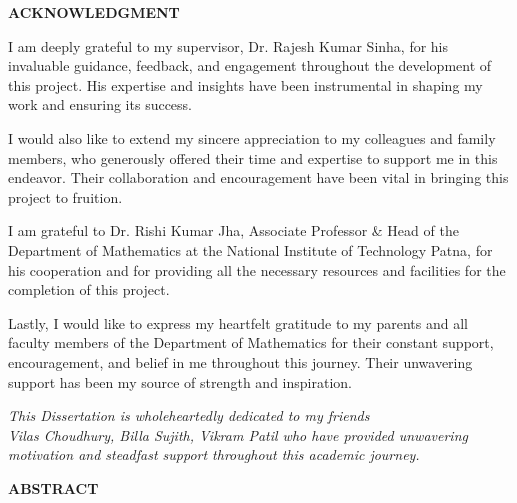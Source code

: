 \documentclass[12pt,a4paper,oneside]{report}
\begin{document}
\newpage
\begin{center}
{\Large\bfseries ACKNOWLEDGMENT}
\end{center}

\vspace{1cm}

\hspace{0.5in}I am deeply grateful to my supervisor, Dr. Rajesh Kumar Sinha, for his invaluable guidance, feedback, and engagement throughout the development of this project. His expertise and insights have been instrumental in shaping my work and ensuring its success.

\hspace{0.5in}I would also like to extend my sincere appreciation to my colleagues and family members, who generously offered their time and expertise to support me in this endeavor. Their collaboration and encouragement have been vital in bringing this project to fruition.

\hspace{0.5in}I am grateful to Dr. Rishi Kumar Jha, Associate Professor \& Head of the Department of Mathematics at the National Institute of Technology Patna, for his cooperation and for providing all the necessary resources and facilities for the completion of this project.

\hspace{0.5in}Lastly, I would like to express my heartfelt gratitude to my parents and all faculty members of the Department of Mathematics for their constant support, encouragement, and belief in me throughout this journey. Their unwavering support has been my source of strength and inspiration.

\newpage
\vspace*{5cm}
\begin{center}
\textit{This Dissertation is wholeheartedly dedicated to my friends\\
Vilas Choudhury, Billa Sujith, Vikram Patil who have provided unwavering\\
motivation and steadfast support throughout this academic journey.}
\end{center}

\newpage
\begin{center}
{\Large\bfseries ABSTRACT}
\end{center}

\vspace{1cm}
\end{document}
